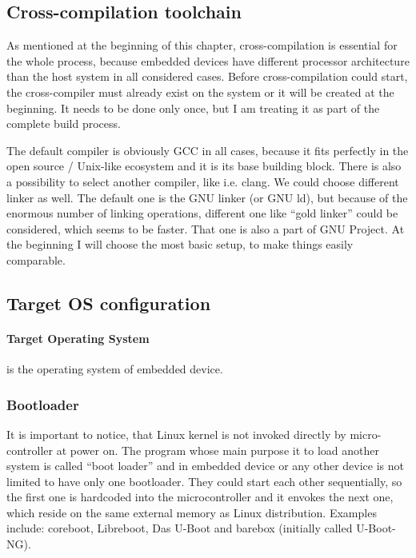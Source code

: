 \documentclass[printmode]{mgr}
\begin{document}
\subsection*{Cross-compilation toolchain}

As mentioned at the beginning of this chapter, cross-compilation is essential for the whole process, because embedded devices have different processor architecture than the host system in all considered cases. Before cross-compilation could start, the cross-compiler must already exist on the system or it will be created at the beginning. It needs to be done only once, but I am treating it as part of the complete build process.

The default compiler is obviously GCC in all cases, because it fits perfectly in the open source / Unix-like ecosystem and it is its base building block. There is also a possibility to select another compiler, like i.e. clang. We could choose different linker as well. The default one is the GNU linker (or GNU ld), but because of the enormous number of linking operations, different one like ``gold linker'' could be considered, which seems to be faster. That one is also a part of GNU Project. At the beginning I will choose the most basic setup, to make things easily comparable. 


\subsection*{Target OS configuration}

\paragraph{Target Operating System} is the operating system of embedded device.

\subsubsection{Bootloader}
It is important to notice, that Linux kernel is not invoked directly by micro-controller at power on. The program whose main purpose it to load another system is called ``boot loader'' and in embedded device or any other device is not limited to have only one bootloader. They could start each other sequentially, so the first one is hardcoded into the microcontroller and it envokes the next one, which reside on the same external memory as Linux distribution. Examples include: coreboot, Libreboot, Das U-Boot and barebox (initially called U-Boot-NG).
\end{document}
